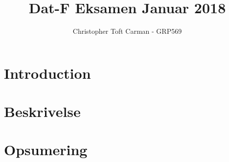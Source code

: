 \documentclass[10pt]{article}
\title{Dat-F Eksamen Januar 2018}
\author{Christopher Toft Carman - GRP569}
\date{}
\begin{document}
\maketitle
\newpage

\section{Introduction} %
\label{sec:introduction}

\section{Beskrivelse} %
\label{sec:beskrivelse}

\section{Opsumering} %
\label{sec:}
\end{document}
